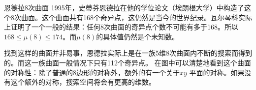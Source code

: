 ﻿\begin{surferPage}{恩德拉8次曲面}
1995年，史蒂芬恩德拉在他的学位论文（埃朗根大学）中构造了这个8次曲面。这个曲面共有168个奇异点，这仍然是当今的世界纪录。瓦尔琴科实际上证明了一个一般的结果：任何8次曲面的奇异点个数不可能有多于168。所以$168 \le \mu(8) \le 174$。而$\mu(8)$的具体值仍然是个未知数。

找到这样的曲面并非易事，恩德拉实际上是在一族5维8次曲面内不断的搜索而得到的。而这一族曲面一般情况下只有112个奇异点。
在图中可以清楚地看到这个曲面的对称性：除了普通的8边形的对称外，额外的有一个关于$xy$ 平面的对称。如果没有这个额外的对称，搜索空间将会有更高的维数。
\end{surferPage}


